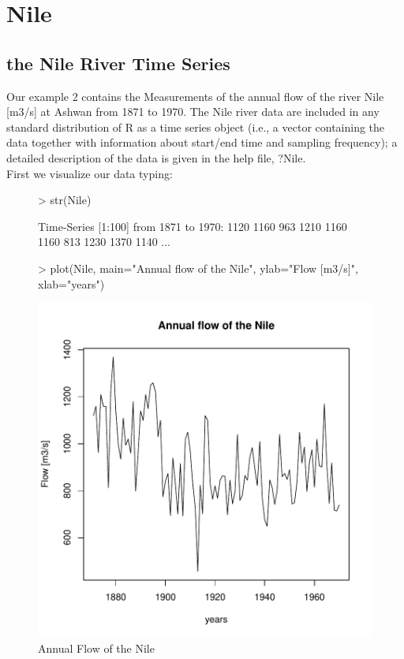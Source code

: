 \documentclass[11pt, a4paper]{article} %
\begin{document}
\section{Nile}
\subsection{the Nile River Time Series}%

\noindent Our example 2 contains the Measurements of the annual flow of the river Nile [m3/s] at Ashwan from 1871 to 1970. The Nile river data are included in any standard distribution of R as a time series object (i.e., a vector containing the data together with information about start/end time and sampling frequency); a detailed description of the data is given in the help file, ?Nile. \\
First we visualize our data typing:

\begin{figure}
\centering
\begin{Schunk}
\begin{Sinput}
> str(Nile)
\end{Sinput}
\begin{Soutput}
 Time-Series [1:100] from 1871 to 1970: 1120 1160 963 1210 1160 1160 813 1230 1370 1140 ...
\end{Soutput}
\begin{Sinput}
> plot(Nile, main="Annual flow of the Nile", ylab="Flow [m3/s]", xlab="years")
\end{Sinput}
\end{Schunk}
\includegraphics{alles-035}
\caption{Annual Flow of the Nile}
\end{figure}
\end{document}
